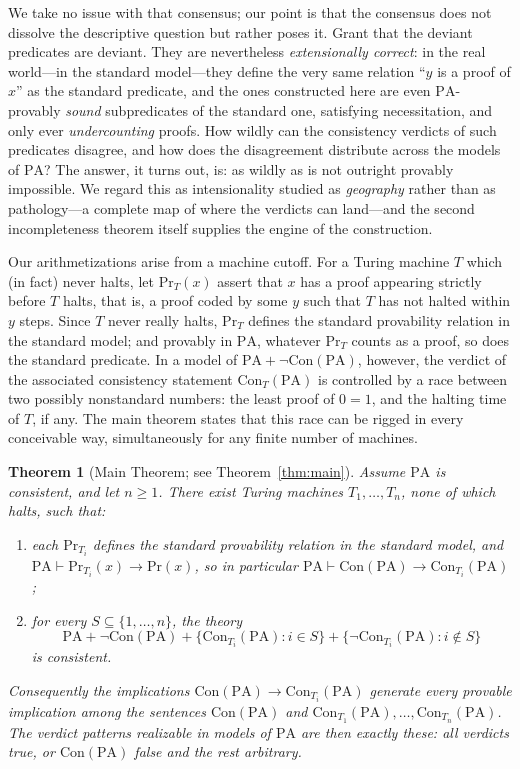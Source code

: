 \documentclass[11pt]{amsart}
\newtheorem{theorem}{Theorem}[section]
\theoremstyle{definition}
\theoremstyle{remark}
\newcommand{\PA}{\mathrm{PA}}
\newcommand{\Con}{\mathrm{Con}}
\newcommand{\Prov}{\mathrm{Pr}}
\begin{document}
We take no issue with that consensus; our point is that the consensus does
not dissolve the descriptive question but rather poses it. Grant that the
deviant predicates are deviant. They are nevertheless \emph{extensionally
correct}: in the real world---in the standard model---they define the very
same relation ``$y$ is a proof of $x$'' as the standard predicate, and the
ones constructed here are even $\PA$-provably \emph{sound} subpredicates
of the standard one, satisfying necessitation, and only ever
\emph{undercounting} proofs. How wildly can the consistency verdicts of
such predicates disagree, and how does the disagreement distribute across
the models of $\PA$? The answer, it turns out, is: as wildly as is not
outright provably impossible. We regard this as intensionality studied as
\emph{geography} rather than as pathology---a complete map of where the
verdicts can land---and the second incompleteness theorem itself supplies
the engine of the construction.

Our arithmetizations arise from a machine cutoff. For a Turing machine
$T$ which (in fact) never halts, let $\Prov_T(x)$ assert that $x$ has a
proof appearing strictly before $T$ halts, that is, a proof coded by some
$y$ such that $T$ has not halted within $y$ steps. Since $T$ never really
halts, $\Prov_T$ defines the standard provability relation in the standard
model; and provably in $\PA$, whatever $\Prov_T$ counts as a proof, so
does the standard predicate. In a model of $\PA+\neg\Con(\PA)$, however,
the verdict of the associated consistency statement $\Con_T(\PA)$ is
controlled by a race between two possibly nonstandard numbers: the least
proof of $0{=}1$, and the halting time of $T$, if any. The main theorem
states that this race can be rigged in every conceivable way,
simultaneously for any finite number of machines.

\begin{theorem}[Main Theorem; see Theorem~\ref{thm:main}]
\label{thm:main-intro}
Assume $\PA$ is consistent, and let $n\ge 1$. There exist Turing machines
$T_1,\dots,T_n$, none of which halts, such that:
\begin{enumerate}
\item each $\Prov_{T_i}$ defines the standard provability relation in the
standard model, and $\PA\vdash \Prov_{T_i}(x)\to\Prov(x)$, so in
particular $\PA\vdash\Con(\PA)\to\Con_{T_i}(\PA)$;
\item for every $S\subseteq\{1,\dots,n\}$, the theory
\[
\PA + \neg\Con(\PA) + \{\Con_{T_i}(\PA) : i\in S\}
    + \{\neg\Con_{T_i}(\PA) : i\notin S\}
\]
is consistent.
\end{enumerate}
Consequently the implications $\Con(\PA)\to\Con_{T_i}(\PA)$ generate
every provable implication among the sentences $\Con(\PA)$ and
$\Con_{T_1}(\PA),\dots,\Con_{T_n}(\PA)$. The verdict patterns
realizable in models of $\PA$ are then exactly these: all verdicts
true, or $\Con(\PA)$ false and the rest arbitrary.
\end{theorem}
\end{document}
